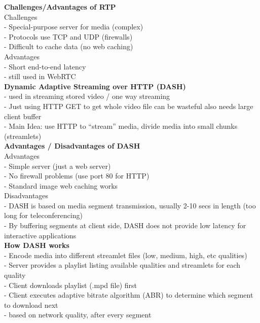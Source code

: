 \documentclass[10pt, a4paper]{article}
\newcommand{\red}[1]{{\color{red}#1}}
\newcommand{\green}[1]{{\color{ForestGreen}#1}}
\newcommand{\tab}[0]{\hspace*{2mm}}
\begin{document}
\begin{multicols*}{3}
		\textbf{Challenges/Advantages of RTP}\\
		\red{Challenges}\\
		- Special-purpose server for media (complex)\\
		- Protocols use TCP and UDP (firewalls)\\
		- Difficult to cache data (no web caching)\\

		\green{Advantages}\\
		- Short end-to-end latency\\
		- \red{still used in WebRTC}\\

		\textbf{Dynamic Adaptive Streaming over HTTP (DASH)}\\
		- used in streaming stored video / one way streaming\\
		- Just using HTTP GET to get whole video file can be \red{wasteful} also needs large client buffer\\
		- Main Idea: use HTTP to ``stream'' media, divide media into small chunks (streamlets)\\

		\textbf{Advantages / Disadvantages of DASH}\\
		\green{Advantages}\\
		- Simple server (just a web server)\\
		- No firewall problems (use port 80 for HTTP)\\
		- Standard image web caching works\\
		\red{Disadvantages}\\
		- DASH is based on media segment transmission, usually 2-10 secs in length (too long for teleconferencing)\\
		- By buffering segments at client side, DASH does \red{not} provide low latency for interactive applications\\

		\textbf{How DASH works}\\
		- Encode media into different streamlet files (low, medium, high, etc qualities)\\
		- Server provides a playlist listing available qualities and streamlets for each quality\\
		- Client downloads playlist (.mpd file) first\\
		- Client executes adaptive bitrate algorithm (ABR) to determine which segment to download next\\
		\tab - based on network quality, after every segment\\


\end{multicols*}
\end{document}
